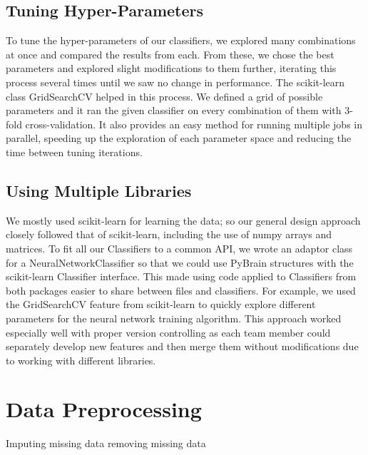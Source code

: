 \documentclass{article}
\begin{document}

\subsection{Tuning Hyper-Parameters}
\label{tuning_parameters}

To tune the hyper-parameters of our classifiers, we explored many combinations at once and compared the results from each.
From these, we chose the best parameters and explored slight modifications to them further, iterating this process several times until we saw no change in performance.
The scikit-learn class GridSearchCV helped in this process.
We defined a grid of possible parameters and it ran the given classifier on every combination of them with 3-fold cross-validation.
It also provides an easy method for running multiple jobs in parallel, speeding up the exploration of each parameter space and reducing the time between tuning iterations.

\subsection{Using Multiple Libraries}
\label{multiple_libraries}

We mostly used scikit-learn for learning the data; so our general design approach closely followed that of scikit-learn, including the use of numpy arrays and matrices.
To fit all our Classifiers to a common API, we wrote an adaptor class for a NeuralNetworkClassifier so that we could use PyBrain structures with the scikit-learn Classifier interface.
This made using code applied to Classifiers from both packages easier to share between files and classifiers.
For example, we used the GridSearchCV feature from scikit-learn to quickly explore different parameters for the neural network training algorithm.
This approach worked especially well with proper version controlling as each team member could separately develop new features and then merge them without modifications due to working with different libraries.



\section{Data Preprocessing}
Imputing missing data
removing missing data
\end{document}
